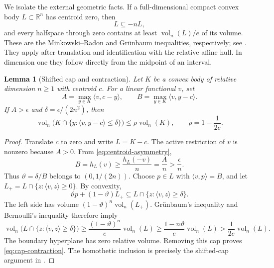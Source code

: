 \documentclass[11pt]{article}
\numberwithin{equation}{section}
\newtheorem{lemma}[lemma]{Lemma}
\theoremstyle{definition}
\theoremstyle{remark}
\newcommand{\R}{\mathbb R}
\newcommand{\eps}{\epsilon}
\DeclareMathOperator{\vol}{vol}
\newcommand{\ip}[2]{\langle #1,#2\rangle}
\begin{document}
We isolate the external geometric facts. If a full-dimensional compact convex body $L\subset\R^n$ has centroid zero, then
\begin{equation}\label{eq:centroid-asymmetry}
L\subseteq-nL,
\end{equation}
and every halfspace through zero contains at least $\vol_n(L)/e$ of its volume. These are the Minkowski--Radon and Gr\"unbaum inequalities, respectively; see \cite[Theorem~A and equation~(1.1)]{AGMSMGYN2024}. They apply after translation and identification with the relative affine hull. In dimension one they follow directly from the midpoint of an interval.

\begin{lemma}[Shifted cap and contraction]\label{lem:cap}
Let $K$ be a convex body of relative dimension $n\ge1$ with centroid $c$. For a linear functional $v$, set
\begin{equation}\label{eq:supports}
A=\max_{y\in K}\ip{v}{c-y},\qquad
B=\max_{y\in K}\ip{v}{y-c}.
\end{equation}
If $A>\eps$ and $\delta=\eps/(2n^2)$, then
\begin{equation}\label{eq:cap-contraction}
\vol_n\bigl(K\cap\{y:\ip{v}{y-c}\le\delta\}\bigr)
\le\rho\vol_n(K),\qquad \rho=1-\frac1{2e}.
\end{equation}
\end{lemma}
\begin{proof}
Translate $c$ to zero and write $L=K-c$. The active restriction of $v$ is nonzero because $A>0$. From \eqref{eq:centroid-asymmetry},
\[
B=h_L(v)\ge\frac{h_L(-v)}n=\frac An>\frac\eps n.
\]
Thus $\vartheta=\delta/B$ belongs to $(0,1/(2n))$. Choose $p\in L$ with $\ip{v}{p}=B$, and let $L_+=L\cap\{z:\ip{v}{z}\ge0\}$. By convexity,
\[
\vartheta p+(1-\vartheta)L_+
\subseteq L\cap\{z:\ip{v}{z}\ge\delta\}.
\]
The left side has volume $(1-\vartheta)^n\vol_n(L_+)$. Gr\"unbaum's inequality and Bernoulli's inequality therefore imply
\[
\vol_n\bigl(L\cap\{z:\ip{v}{z}\ge\delta\}\bigr)
\ge\frac{(1-\vartheta)^n}{e}\vol_n(L)
\ge\frac{1-n\vartheta}{e}\vol_n(L)
>\frac1{2e}\vol_n(L).
\]
The boundary hyperplane has zero relative volume. Removing this cap proves \eqref{eq:cap-contraction}. The homothetic inclusion is precisely the shifted-cap argument in \cite[Lemma~2.1]{Naszodi2017}.
\end{proof}
\end{document}
